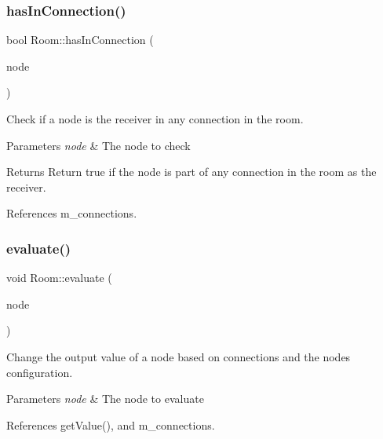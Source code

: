 \subsubsection{\texorpdfstring{has\+In\+Connection()}{hasInConnection()}}
{\footnotesize\ttfamily bool Room\+::has\+In\+Connection (\begin{DoxyParamCaption}\item[{\mbox{\hyperlink{classNode}{Node}} $\ast$}]{node }\end{DoxyParamCaption})}



Check if a node is the receiver in any connection in the room. 


\begin{DoxyParams}{Parameters}
{\em node} & The node to check \\
\hline
\end{DoxyParams}
\begin{DoxyReturn}{Returns}
Return true if the node is part of any connection in the room as the receiver. 
\end{DoxyReturn}


References m\+\_\+connections.

\mbox{\label{classRoom_a0f8b282b43bd3115e24f6b9bd95d92a9}} 
\subsubsection{\texorpdfstring{evaluate()}{evaluate()}}
{\footnotesize\ttfamily void Room\+::evaluate (\begin{DoxyParamCaption}\item[{\mbox{\hyperlink{classNode}{Node}} $\ast$}]{node }\end{DoxyParamCaption})}



Change the output value of a node based on connections and the nodes\textquotesingle{} configuration. 


\begin{DoxyParams}{Parameters}
{\em node} & The node to evaluate \\
\hline
\end{DoxyParams}


References get\+Value(), and m\+\_\+connections.

\mbox{\label{classRoom_ad795aa64d503519ba0777e3f1d81e54c}} 
